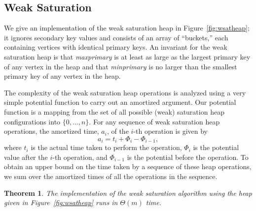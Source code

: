 \subsection{Weak Saturation}
We give an implementation of the weak saturation heap in 
Figure~\ref{fig:wsatheap}; it ignores secondary key values and consists of an 
array of ``buckets,'' each containing vertices with identical primary keys.
An invariant for the weak saturation heap is that {\it maxprimary} is at 
least as large as the largest primary key of any vertex in the heap and that 
{\it minprimary} is no larger than the smallest primary key of any vertex 
in the heap.

The complexity of the weak saturation heap operations is analyzed using a very 
simple potential function to carry out an amortized argument.  Our potential 
function is a mapping from the set of all possible (weak) saturation heap 
configurations into $\{0, \ldots, n\}$.  For any sequence of weak saturation 
heap operations, the amortized time, $a_i$, of the $i$-th operation is given by
\[
a_i = t_i + \Phi_i - \Phi_{i-1},
\]
where $t_i$ is the actual time taken to perform the operation, $\Phi_i$ is the 
potential value after the $i$-th operation, and $\Phi_{i-1}$ is the potential 
before the operation.  To obtain an upper bound on the time taken by a 
sequence of these heap operations, we sum over the amortized times of all 
the operations in the sequence.

\newtheorem{thm31}{Theorem}[section]
\begin{thm31}
\label{weakthm}
The implementation of the weak saturation algorithm using the heap given in
Figure~\ref{fig:wsatheap} runs in $\Theta(m)$ time.
\end{thm31}

